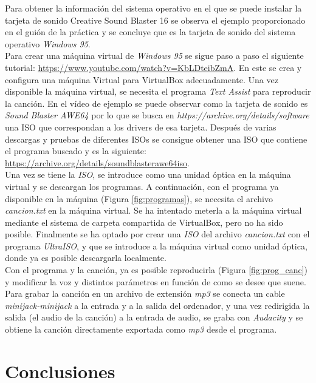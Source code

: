 \documentclass{article}
\begin{document}
Para obtener la información del sistema operativo en el que se puede instalar la tarjeta de sonido Creative Sound Blaster 16 se observa el ejemplo proporcionado en el guión de la práctica y se concluye que es la tarjeta de sonido del sistema operativo \emph{Windows 95}. \\

Para crear una máquina virtual de \emph{Windows 95} se sigue paso a paso el siguiente tutorial: \url{https://www.youtube.com/watch?v=KbLDteibZmA}. En este se crea y configura una máquina Virtual para VirtualBox adecuadamente. Una vez disponible la máquina virtual, se necesita el programa \emph{Text Assist} para reproducir la canción. En el vídeo de ejemplo se puede observar como la tarjeta de sonido es \emph{Sound Blaster AWE64} por lo que se busca en \emph{https://archive.org/details/software} una ISO que correspondan a los drivers de esa tarjeta. Después de varias descargas y pruebas de diferentes ISOs se consigue obtener una ISO que contiene el programa buscado y es la siguiente: \url{https://archive.org/details/soundblasterawe64iso}.\\

Una vez se tiene la \textit{ISO}, se introduce como una unidad óptica en la máquina virtual y se descargan los programas. A continuación, con el programa ya disponible en la máquina (Figura \ref{fig:programas}), se necesita el archivo \emph{cancion.txt} en la máquina virtual. Se ha intentado meterla a la máquina virtual mediante el sistema de carpeta compartida de VirtualBox, pero no ha sido posible. Finalmente se ha optado por crear una \textit{ISO} del archivo \emph{cancion.txt} con el programa \emph{UltraISO}, y que se introduce a la máquina virtual como unidad óptica, donde ya es posible descargarla localmente.\\

Con el programa y la canción, ya es posible reproducirla (Figura \ref{fig:prog_canc}) y modificar la voz y distintos parámetros en función de como se desee que suene. \\

Para grabar la canción en un archivo de extensión \emph{mp3} se conecta un cable \textit{minijack-minijack} a la entrada y a la salida del ordenador, y una vez redirigida la salida (el audio de la canción) a la entrada de audio, se graba con \emph{Audacity} y se obtiene la canción directamente exportada como \emph{mp3} desde el programa.\\


\section{Conclusiones}
\end{document}
